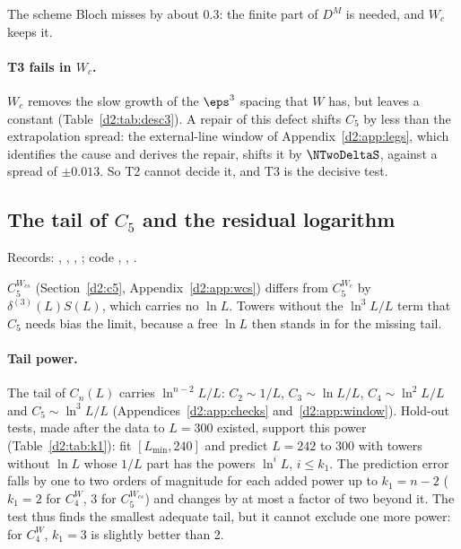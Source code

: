 The scheme Bloch misses by about $0.3$: the finite part of $D^M$ is needed, and $W_c$ keeps it.

\paragraph{T3 fails in $W_c$.} $W_c$ removes the slow growth of the $\eps^3$ spacing that $W$ has, but leaves a constant
(Table~\ref{d2:tab:desc3}). A repair of this defect shifts $C_5$ by less than the extrapolation spread: the external-line
window of Appendix~\ref{d2:app:legs}, which identifies the cause and derives the repair, shifts it by $\NTwoDeltaS$, against
a spread of $\pm0.013$. So T2 cannot decide it, and T3 is the decisive test.

\subsection{The tail of \texorpdfstring{$C_5$}{C5} and the residual logarithm}\label{d2:app:c5tail}
{\small\raggedright\noindent Records: ,
,
,
; code ,
, .\par}

$C_5^{W_{cs}}$ (Section~\ref{d2:c5}, Appendix~\ref{d2:app:wcs}) differs from $C_5^{W_c}$ by $\delta^{(3)}(L)S(L)$, which
carries no $\ln L$. Towers without the $\ln^3L/L$ term that $C_5$ needs bias the limit, because a free $\ln L$ then stands in
for the missing tail.

\paragraph{Tail power.} The tail of $C_n(L)$ carries $\ln^{n-2}L/L$: $C_2\sim1/L$, $C_3\sim\ln L/L$, $C_4\sim\ln^2L/L$ and
$C_5\sim\ln^3L/L$ (Appendices~\ref{d2:app:checks} and~\ref{d2:app:window}). Hold-out tests, made after the data to $L=300$ existed, support this power
(Table~\ref{d2:tab:k1}): fit $[L_{\min},240]$ and predict $L=242$ to 300 with towers without $\ln L$ whose $1/L$ part has
the powers $\ln^iL$, $i\le k_1$. The prediction error falls by one to two orders of magnitude for each added power up to
$k_1=n-2$ ($k_1=2$ for $C_4^W$, 3 for $C_5^{W_{cs}}$) and changes by at most a factor of two beyond it. The test thus finds
the smallest adequate tail, but it cannot exclude one more power: for $C_4^W$, $k_1=3$ is slightly better than 2.

